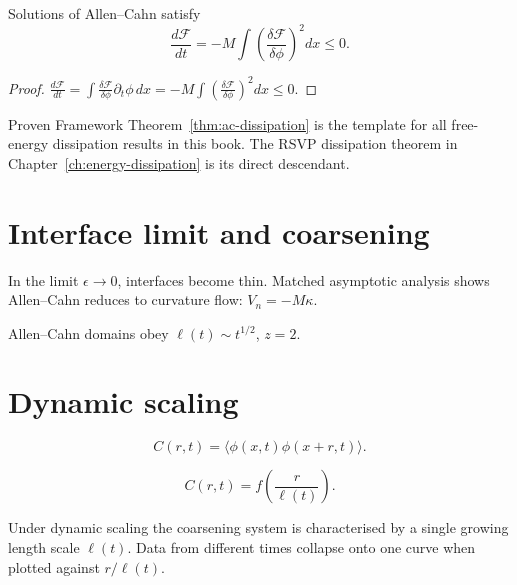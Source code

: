 \begin{theorem}
  \label{thm:ac-dissipation}
  \statusproven{}
  Solutions of Allen--Cahn satisfy
  \[
    \frac{d\mathcal{F}}{dt}
    = -M\int\left(\frac{\delta\mathcal{F}}{\delta\phi}\right)^2 dx
    \leq 0.
  \]
\end{theorem}

\begin{proof}
  $\frac{d\mathcal{F}}{dt}
  = \int\frac{\delta\mathcal{F}}{\delta\phi}\partial_t\phi\,dx
  = -M\int\left(\frac{\delta\mathcal{F}}{\delta\phi}\right)^2 dx
  \leq 0$.
\end{proof}

\begin{StatusBox}{Proven Framework}
  Theorem~\ref{thm:ac-dissipation} is the template for all
  free-energy dissipation results in this book.
  The RSVP dissipation theorem in
  Chapter~\ref{ch:energy-dissipation} is its direct descendant.
\end{StatusBox}

\section{Interface limit and coarsening}

In the limit $\epsilon \to 0$, interfaces become thin.
Matched asymptotic analysis shows Allen--Cahn reduces to
curvature flow: $V_n = -M\kappa$.

\begin{corollary}
  Allen--Cahn domains obey $\ell(t) \sim t^{1/2}$, $z = 2$.
\end{corollary}

\section{Dynamic scaling}

\begin{definition}
  \[
    C(r,t) = \langle\phi(x,t)\phi(x+r,t)\rangle.
  \]
\end{definition}

\begin{definition}
  \[
    C(r,t) = f\!\left(\frac{r}{\ell(t)}\right).
  \]
\end{definition}

Under dynamic scaling the coarsening system is characterised
by a single growing length scale $\ell(t)$.
Data from different times collapse onto one curve when plotted
against $r/\ell(t)$.

